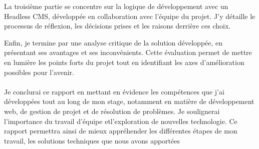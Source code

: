 \vspace*{1cm}

La troisième partie se concentre sur la logique de développement avec un Headless CMS, développée en collaboration avec l'équipe du projet. J'y détaille le processus de réflexion, les décisions prises et les raisons derrière ces choix.


Enfin, je termine par une analyse critique de la solution développée, en présentant ses avantages et ses inconvénients. Cette évaluation permet de mettre en lumière les points forts du projet tout en identifiant les axes d'amélioration possibles pour l'avenir.
\\ \\
Je conclurai ce rapport en mettant en évidence les compétences que j'ai développées tout au long de mon stage, notamment en matière de développement web, de gestion de projet et de résolution de problèmes. Je soulignerai l'importance du travail d'équipe etl'exploration de nouvelles technologie. Ce rapport permettra ainsi de mieux appréhender les différentes étapes de mon travail, les solutions techniques que nous avons apportées